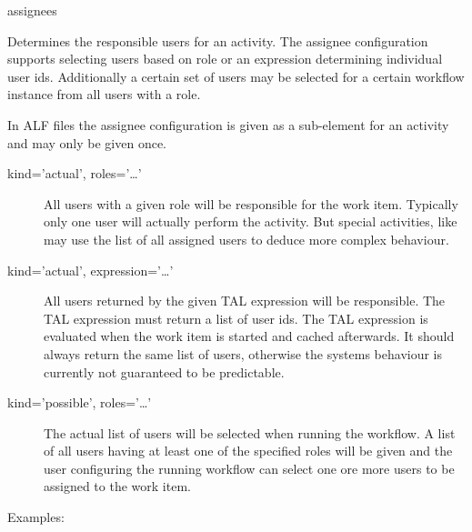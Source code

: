   \begin{memberdesc}{assignees}

        Determines the responsible users for an activity. The assignee
        configuration supports selecting users based on role or an expression
        determining individual user ids. Additionally a certain set of users
        may be selected for a certain workflow instance from all users with a
        role.

        In ALF files the assignee configuration is given as a sub-element for
        an activity and may only be given once.

        \begin{description}

            \item[kind='actual', roles='\ldots'] All users with a given role
                will be responsible for the work item. Typically only one user
                will actually perform the activity. But special activities,
                like  may use the list of all assigned users to
                deduce more complex behaviour. 

            \item[kind='actual', expression='\ldots'] All users returned by the
                given TAL expression will be responsible. The TAL expression
                must return a list of user ids. The TAL expression is evaluated
                when the work item is started and cached afterwards. It should
                always return the same list of users, otherwise the systems
                behaviour is currently not guaranteed to be predictable.

            \item[kind='possible', roles='\ldots']

                The actual list of users will be selected when running the
                workflow. A list of all users having at least one of the
                specified roles will be given and the user configuring the
                running workflow can select one ore more users to be assigned
                to the work item.
                
        \end{description}

        Examples:


\end{memberdesc}
